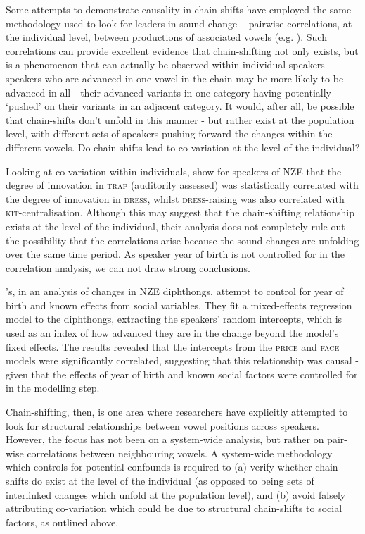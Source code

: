 \documentclass[review]{elsarticle} %
\begin{document}
Some attempts to demonstrate causality in chain-shifts have employed the same methodology used to look for leaders in sound-change – pairwise correlations, at the individual level, between productions of associated vowels (e.g. \citealt{gordon2004new, boberg2019closer, kendall2017regional}). Such correlations can provide excellent evidence that chain-shifting not only exists, but is a phenomenon that can actually be observed within individual speakers - speakers who are advanced in one vowel in the chain may be more likely to be advanced in all - their advanced variants in one category having potentially `pushed' on their variants in an adjacent category. It would, after all, be possible that chain-shifts don't unfold in this manner - but rather exist at the population level, with different sets of speakers pushing forward the changes within the different vowels. Do chain-shifts lead to co-variation at the level of the individual?

Looking at co-variation within individuals, \cite{gordon2004new} show for speakers of NZE that the degree of innovation in \textsc{trap} (auditorily assessed) was statistically correlated with the degree of innovation in \textsc{dress}, whilst \textsc{dress}-raising was also correlated with \textsc{kit}-centralisation. Although this may suggest that the chain-shifting relationship exists at the level of the individual, their analysis does not completely rule out the possibility that the correlations arise because the sound changes are unfolding over the same time period.  As speaker year of birth is not controlled for in the correlation analysis, we can not draw strong conclusions.

\cite{soskuthy2017closing}'s, in an analysis of changes in NZE diphthongs, attempt to control for year of birth and known effects from social variables.  They fit a mixed-effects regression model to the diphthongs, extracting the speakers' random intercepts, which is used as an index of how advanced they are in the change beyond the model's fixed effects. The results revealed that the intercepts from the \textsc{price} and \textsc{face} models were significantly correlated, suggesting that this relationship was causal - given that the effects of year of birth and known social factors were controlled for in the modelling step.

Chain-shifting, then, is one area where researchers have explicitly attempted to look for structural relationships between vowel positions across speakers.  However, the focus has not been on a system-wide analysis, but rather on pair-wise correlations between neighbouring vowels.   A system-wide methodology which controls for potential confounds is required to (a) verify whether chain-shifts do exist at the level of the individual (as opposed to being sets of interlinked changes which unfold at the population level), and (b) avoid falsely attributing co-variation which could be due to structural chain-shifts to social factors, as outlined above.
\end{document}
